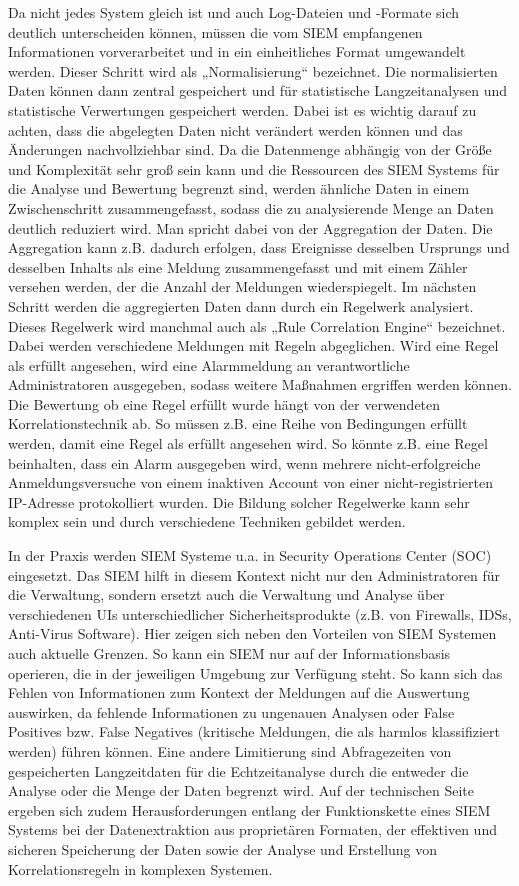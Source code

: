 Da nicht jedes System gleich ist und auch Log-Dateien und -Formate sich deutlich unterscheiden können, müssen die vom SIEM empfangenen Informationen vorverarbeitet und in ein einheitliches Format umgewandelt werden. Dieser Schritt wird als „Normalisierung“ bezeichnet. Die normalisierten Daten können dann zentral gespeichert und für statistische Langzeitanalysen und statistische Verwertungen gespeichert werden. Dabei ist es wichtig darauf zu achten, dass die abgelegten Daten nicht verändert werden können und das Änderungen nachvollziehbar sind. Da die Datenmenge abhängig von der Größe und Komplexität sehr groß sein kann und die Ressourcen des SIEM Systems für die Analyse und Bewertung begrenzt sind, werden ähnliche Daten in einem Zwischenschritt zusammengefasst, sodass die zu analysierende Menge an Daten deutlich reduziert wird. Man spricht dabei von der Aggregation der Daten. Die Aggregation kann z.B. dadurch erfolgen, dass Ereignisse desselben Ursprungs und desselben Inhalts als eine Meldung zusammengefasst und mit einem Zähler versehen werden, der die Anzahl der Meldungen wiederspiegelt.
Im nächsten Schritt werden die aggregierten Daten dann durch ein Regelwerk analysiert. Dieses Regelwerk wird manchmal auch als „Rule Correlation Engine“ bezeichnet. Dabei werden verschiedene Meldungen mit Regeln abgeglichen. Wird eine Regel als erfüllt angesehen, wird eine Alarmmeldung an verantwortliche Administratoren ausgegeben, sodass weitere Maßnahmen ergriffen werden können.  Die Bewertung ob eine Regel erfüllt wurde hängt von der verwendeten Korrelationstechnik ab. So müssen z.B. eine Reihe von Bedingungen erfüllt werden, damit eine Regel als erfüllt angesehen wird. So könnte z.B. eine Regel beinhalten, dass ein Alarm ausgegeben wird, wenn mehrere nicht-erfolgreiche Anmeldungsversuche von einem inaktiven Account von einer nicht-registrierten IP-Adresse protokolliert wurden. Die Bildung solcher Regelwerke kann sehr komplex sein und durch verschiedene Techniken gebildet werden.


In der Praxis werden SIEM Systeme u.a. in Security Operations Center (SOC) eingesetzt. Das SIEM hilft in diesem Kontext nicht nur den Administratoren für die Verwaltung, sondern ersetzt auch die Verwaltung und Analyse über verschiedenen UIs unterschiedlicher Sicherheitsprodukte (z.B. von Firewalls, IDSs, Anti-Virus Software). 
Hier zeigen sich neben den Vorteilen von SIEM Systemen auch aktuelle Grenzen. So kann ein SIEM nur auf der Informationsbasis operieren, die in der jeweiligen Umgebung zur Verfügung steht. So kann sich das Fehlen von Informationen zum Kontext der Meldungen auf die Auswertung auswirken, da fehlende Informationen zu ungenauen Analysen oder False Positives bzw. False Negatives (kritische Meldungen, die als harmlos klassifiziert werden) führen können. Eine andere Limitierung sind Abfragezeiten von gespeicherten Langzeitdaten für die Echtzeitanalyse durch die entweder die Analyse oder die Menge der Daten begrenzt wird. Auf der technischen Seite ergeben sich zudem Herausforderungen entlang der Funktionskette eines SIEM Systems bei der Datenextraktion aus proprietären Formaten, der effektiven und sicheren Speicherung der Daten sowie der Analyse und Erstellung von Korrelationsregeln in komplexen Systemen. 



